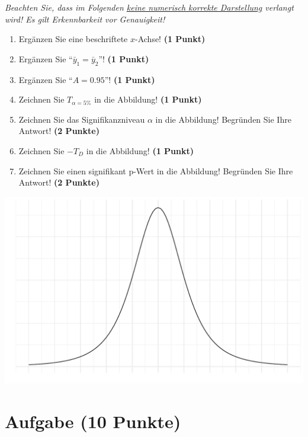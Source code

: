 \documentclass[a4paper, 9pt]{scrartcl}\usepackage[]{graphicx}\usepackage[]{xcolor}
\makeatletter
\def\maxwidth{ %
  \ifdim\Gin@nat@width>\linewidth
    \linewidth
  \else
    \Gin@nat@width
  \fi
}
\makeatother
\begin{document}
\vspace{1ex}

\textit{Beachten Sie, dass im Folgenden \underline{keine numerisch korrekte Darstellung} verlangt wird! Es gilt Erkennbarkeit vor Genauigkeit!}

\begin{enumerate}
\item Ergänzen Sie eine beschriftete $x$-Achse! \textbf{(1 Punkt)}
\item Ergänzen Sie "`$\bar{y}_1 = \bar{y}_2$"'! \textbf{(1 Punkt)} 
\item Ergänzen Sie "`$A = 0.95$"'! \textbf{(1 Punkt)}
\item Zeichnen Sie $T_{\alpha=5\%}$ in die Abbildung! \textbf{(1 Punkt)} 
\item Zeichnen Sie das Signifikanzniveau $\alpha$ in die Abbildung! Begründen Sie Ihre Antwort! \textbf{(2 Punkte)} 
\item Zeichnen Sie $-T_{D}$ in die Abbildung! \textbf{(1 Punkt)}
\item Zeichnen Sie einen signifikant p-Wert in die Abbildung! Begründen Sie Ihre Antwort! \textbf{(2 Punkte)}   
\end{enumerate}



{\centering \includegraphics[width=\maxwidth]{img/statistisches-testen-3-1} 

}


 
\clearpage

\section{Aufgabe \hfill (10 Punkte)}
\end{document}
